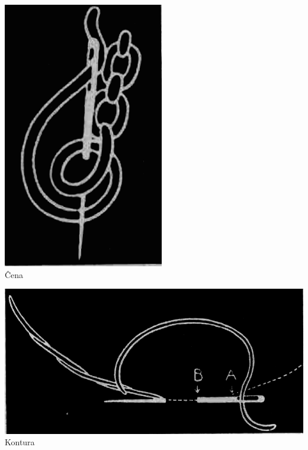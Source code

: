 \begin{center}\includegraphics[keepaspectratio,width=\textwidth,height=0.75\textheight]{5.png}\\
Ĉena\end{center}

\begin{center}\includegraphics[keepaspectratio,width=\textwidth,height=0.75\textheight]{6.png}\\
Kontura\end{center}

